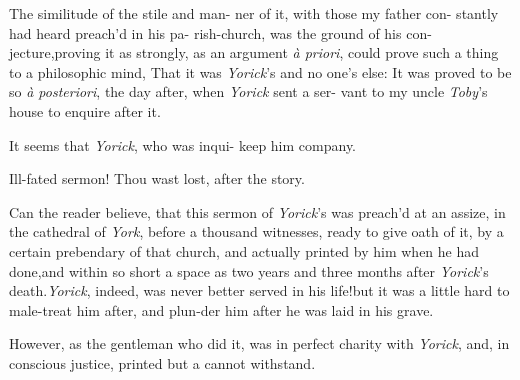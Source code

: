 \documentclass{article}
\begin{document}
The similitude of the stile and man-\break
ner of it, with those my father con-\break
stantly had heard preach’d in his pa-\break
rish-church, was the ground of his con-\break
jecture,\tsh proving it as strongly, as\break
an argument \textit{à priori}, could prove such\break
a thing to a philosophic mind, That\break
it was \textit{Yorick}’s and no one’s else:\tsh\break 
It was proved to be so \textit{à posteriori},\break
the day after, when \textit{Yorick} sent a ser-\break
vant to my uncle \textit{Toby}’s house to enquire\break
after it.

It seems that \textit{Yorick}, who was inqui-
keep him company.

Ill-fated sermon! Thou wast lost, after
the story.

Can the reader believe, that this sermon of
\textit{Yorick}’s was preach’d at an assize, in the cathedral
of \textit{York}, before a thousand witnesses, ready to give oath of
it, by a certain prebendary of that church, and actually printed by
him when he had done,\tsh and within so short a space as
two years and three months after \textit{Yorick}’s
death.\tsk \textit{Yorick}, indeed, was never better served in his
life!\tsh but it was a little hard to male-treat him after,
and plun-\break der him after he was laid in his grave.

However, as the gentleman who did it, was in perfect charity with
\textit{Yorick},\tsk\break
and, in conscious justice, printed but a
cannot withstand.
\end{document}
